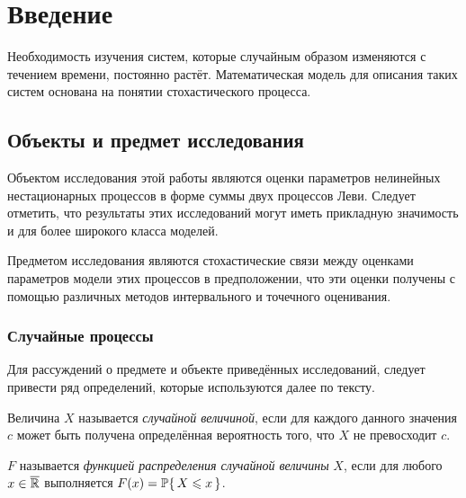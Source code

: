\chapter*{Введение}							%
\setcounter{chapter}{1}

Необходимость изучения систем, которые случайным образом изменяются с течением времени, постоянно растёт. Математическая модель для описания таких систем основана на понятии стохастического процесса.

\section*{Объекты и предмет исследования}
Объектом исследования этой работы являются оценки параметров нелинейных нестационарных процессов в форме суммы двух процессов Леви. Следует отметить, что результаты этих исследований могут иметь прикладную значимость и для более широкого класса моделей.

Предметом исследования являются стохастические связи между оценками параметров модели этих процессов в предположении, что эти оценки получены с помощью различных методов интервального и точечного оценивания.

\subsection*{Случайные процессы}

Для рассуждений о предмете и объекте приведённых исследований, следует привести ряд определений, которые используются далее по тексту.

\begin{define}
	Величина $X$ называется \emph{случайной величиной}, если для каждого данного значения $c$ может быть получена определённая вероятность того, что $X$ не превосходит $c$.
\end{define}

\begin{define}
	$F$ называется \emph{функцией распределения случайной величины} $X$, если для любого $x \in \exR$ выполняется $F(x) = \P\{\, X \leqslant x \,\}$.
\end{define}

